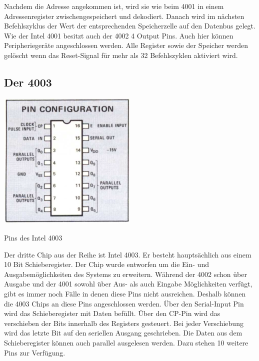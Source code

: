  Nachdem die Adresse angekommen ist, wird sie wie beim 4001 in einem Adressenregister zwischengespeichert und dekodiert. Danach wird im nächsten Befehlszyklus der Wert der entsprechenden Speicherzelle auf den Datenbus gelegt. Wie der Intel 4001 besitzt auch der 4002 4 Output Pins. Auch hier können Peripheriegeräte angeschlossen werden. Alle Register sowie der Speicher werden gelöscht wenn das Reset-Signal für mehr als 32 Befehlszyklen aktiviert wird.

\subsection{Der 4003}
 \begin{floatingfigure}[r]{.5\textwidth}
 	\vspace{-10pt}
 	\includegraphics[width=0.5\textwidth]{figures/pins_4003.png}
 	\caption{Pins des Intel 4003}
 	\label{fig:pins_4003}
 \end{floatingfigure}
Der dritte Chip aus der Reihe ist Intel 4003. Er besteht hauptsächlich aus einem 10 Bit Schieberegister. Der Chip wurde entworfen um die Ein- und Ausgabemöglichkeiten des Systems zu erweitern. Während der 4002 schon über Ausgabe und der 4001 sowohl über Aus- als auch Eingabe Möglichkeiten verfügt, gibt es immer noch Fälle in denen diese Pins nicht ausreichen. Deshalb können die 4003 Chips an diese Pins angeschlossen werden. Über den Serial-Input Pin wird das Schieberegister mit Daten befüllt. Über den CP-Pin wird das verschieben der Bits innerhalb des Registers gesteuert. Bei jeder Verschiebung wird das letzte Bit auf den seriellen Ausgang geschrieben. Die Daten aus dem Schieberegister können auch parallel ausgelesen werden. Dazu stehen 10 weitere Pins zur Verfügung.
